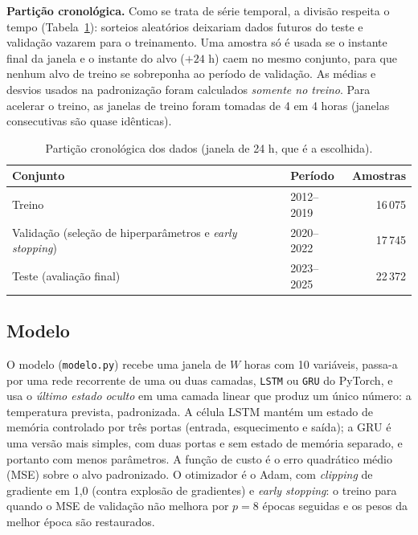 \documentclass[11pt,a4paper]{article}
\begin{document}
\textbf{Partição cronológica.} Como se trata de série temporal, a divisão respeita o tempo (Tabela~\ref{tab:dados}): sorteios aleatórios deixariam dados futuros do teste e validação vazarem para o treinamento. Uma amostra só é usada se o instante final da janela e o instante do alvo ($+24$ h) caem no mesmo conjunto, para que nenhum alvo de treino se sobreponha ao período de validação. As médias e desvios usados na padronização foram calculados \emph{somente no treino}. Para acelerar o treino, as janelas de treino foram tomadas de 4 em 4 horas (janelas consecutivas são quase idênticas).

\begin{table}[ht]
\centering
\small
\caption{Partição cronológica dos dados (janela de 24 h, que é a escolhida).}
\label{tab:dados}
\begin{tabular}{llr}
\toprule
\textbf{Conjunto} & \textbf{Período} & \textbf{Amostras} \\
\midrule
Treino & 2012--2019 & 16\,075 \\
Validação (seleção de hiperparâmetros e \emph{early stopping}) & 2020--2022 & 17\,745 \\
Teste (avaliação final) & 2023--2025 & 22\,372 \\
\bottomrule
\end{tabular}
\end{table}

\subsection{Modelo}
O modelo (\texttt{modelo.py}) recebe uma janela de $W$ horas com 10 variáveis, passa-a por uma rede recorrente de uma ou duas camadas, \texttt{LSTM} ou \texttt{GRU} do PyTorch, e usa o \emph{último estado oculto} em uma camada linear que produz um único número: a temperatura prevista, padronizada. A célula LSTM mantém um estado de memória controlado por três portas (entrada, esquecimento e saída); a GRU é uma versão mais simples, com duas portas e sem estado de memória separado, e portanto com menos parâmetros. A função de custo é o erro quadrático médio (MSE) sobre o alvo padronizado. O otimizador é o Adam, com \emph{clipping} de gradiente em 1,0 (contra explosão de gradientes) e \emph{early stopping}: o treino para quando o MSE de validação não melhora por $p=8$ épocas seguidas e os pesos da melhor época são restaurados.
\end{document}

